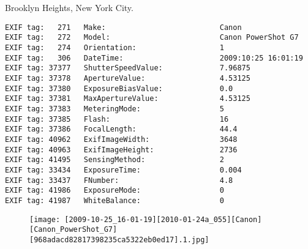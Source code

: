 \section{\protect{}}
\noindent Brooklyn Heights, New York City.
\noindent
\begin{lstlisting}
EXIF tag:   271   Make:                          Canon
EXIF tag:   272   Model:                         Canon PowerShot G7
EXIF tag:   274   Orientation:                   1
EXIF tag:   306   DateTime:                      2009:10:25 16:01:19
EXIF tag: 37377   ShutterSpeedValue:             7.96875
EXIF tag: 37378   ApertureValue:                 4.53125
EXIF tag: 37380   ExposureBiasValue:             0.0
EXIF tag: 37381   MaxApertureValue:              4.53125
EXIF tag: 37383   MeteringMode:                  5
EXIF tag: 37385   Flash:                         16
EXIF tag: 37386   FocalLength:                   44.4
EXIF tag: 40962   ExifImageWidth:                3648
EXIF tag: 40963   ExifImageHeight:               2736
EXIF tag: 41495   SensingMethod:                 2
EXIF tag: 33434   ExposureTime:                  0.004
EXIF tag: 33437   FNumber:                       4.8
EXIF tag: 41986   ExposureMode:                  0
EXIF tag: 41987   WhiteBalance:                  0

\end{lstlisting}
\clearpage
\begin{figure}
\raggedleft
\texttt{[image: [2009-10-25\_16-01-19][2010-01-24a\_055][Canon][Canon\_PowerShot\_G7][968adacd82817398235ca5322eb0ed17].1.jpg]}
\end{figure}


\clearpage
